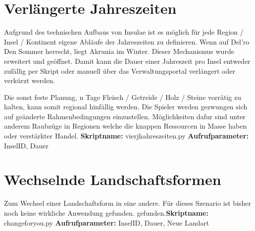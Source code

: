 \section {Verl{\"a}ngerte Jahreszeiten}
Aufgrund des technischen Aufbaus von Insulae ist es m{\"o}glich f{\"u}r jede Region /
Insel / Kontinent eigene Abl{\"a}ufe der Jahreszeiten zu definieren. Wenn auf
Del'ro Den Sommer herrscht, liegt Akrunia im Winter.
Dieser Mechanismus wurde erweitert und ge{\"o}ffnet. Damit kann die Dauer einer
Jahreszeit pro Insel entweder zuf{\"a}llig per Skript oder manuell {\"u}ber das
Verwaltungsportal verl{\"a}ngert oder verk{\"u}rzt werden.\newline

Die sonst feste Planung, n Tage Fleisch / Getreide / Holz / Steine
vorr{\"a}tig zu halten, kann somit regional hinf{\"a}llig werden. Die Spieler
werden gezwungen sich auf ge{\"a}nderte Rahmenbedingungen einzustellen.
M{\"o}glichkeiten daf{u}r sind unter anderem Raubz{\"u}ge in Regionen welche die
knappen Ressourcen in Masse haben oder verst{\"a}rkter Handel.
\newline\newline
\textbf{Skriptname:} vierjhahreszeiten.py
\newline\newline
\textbf{Aufrufparameter:} InselID, Dauer

\section {Wechselnde Landschaftsformen}
Zum Wechsel einer Landschaftsform in eine andere.
\newline\newline
F{\"u}r dieses Szenario ist bisher noch keine wirkliche Anwendung gefunden.
gefunden.\newline \textbf{Skriptname:} changeforyou.py
\newline\newline
\textbf{Aufrufparameter:} InselID, Dauer, Neue Landart
